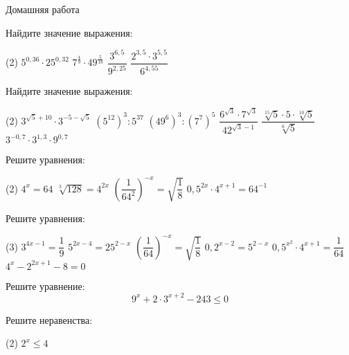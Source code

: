 \begin{homework}[number=2]
	\begin{listofex}
		\item Домашняя работа
	\end{listofex}
\end{homework}

\begin{class}[number=3]
	\begin{listofex}
		\item Найдите значение выражения:
		\begin{tasks}(2)
			\task \( 5^{0,36} \cdot 25^{0,32} \)
			\task \( 7^{\tfrac{4}{9}} \cdot 49^{\tfrac{5}{18}} \)
			\task \( \dfrac{3^{6,5}}{9^{2,25}} \)
			\task \( \dfrac{2^{3,5}\cdot3^{5,5}}{6^{4,55}} \)
		\end{tasks}
		\item Найдите значение выражения:
		\begin{tasks}(2)
			\task \( 3^{\sqrt{5}+10}\cdot3^{-5-\sqrt{5}} \)
			\task \( (5^{12})^3 : 5^{37} \)
			\task \( (49^6)^3:(7^7)^5 \)
			\task \( \dfrac{6^{\sqrt{3}}\cdot7^{\sqrt{3}}}{42^{\sqrt{3}-1}} \)
			\task \( \dfrac{\sqrt[15]{5}\cdot5\cdot\sqrt[10]{5}}{\sqrt[6]{5}} \)
			\task \( 3^{-0,7}\cdot 3^{1,3} \cdot 9^{0,7}\)
		\end{tasks}
		\item Решите уравнения:
		\begin{tasks}(2)
			\task \( 4^x=64 \)
			\task \( \sqrt[3]{128}=4^{2x} \)
			\task \( \left( \dfrac{1}{64^2} \right)^{-x}=\sqrt{\dfrac{1}{8}} \)
			\task \( 0,5^{2x}\cdot 4^{x+1}=64^{-1} \)
		\end{tasks}
		\item Решите уравнения:
		\begin{tasks}(3)
			\task \( 3^{4x-1}=\dfrac{1}{9} \)
			\task \( 5^{2x-4}=25^{2-x} \)
			\task \( \left(\dfrac{1}{64}\right)^{-x}=\sqrt{\dfrac{1}{8}} \)
			\task \( 0,2^{x-2}=5^{2-x} \)
			\task \( 0,5^{x^2}\cdot 4^{x+1}=\dfrac{1}{64} \)
			\task \( 4^x-2^{2x+1}-8=0 \)
		\end{tasks}
		\item Решите уравнение:
		\[9^x+2\cdot3^{x+2}-243\le0\]
		\item Решите неравенства:
		\begin{tasks}(2)
			\task \( 2^x \le 4 \)

\end{tasks}
\end{listofex}
\end{class}
